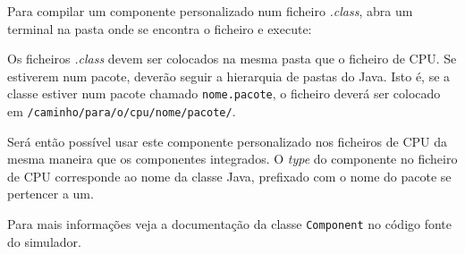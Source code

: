 \documentclass[11pt,a4paper,twoside,titlepage]{report}
\begin{document}
Para compilar um componente personalizado num ficheiro \emph{.class}, abra
um terminal na pasta onde se encontra o ficheiro e execute:



Os ficheiros \emph{.class} devem ser colocados na mesma pasta que o ficheiro de CPU.
Se estiverem num pacote, deverão seguir a hierarquia de pastas do Java.
Isto é, se a classe estiver num pacote chamado \verb+nome.pacote+, o ficheiro
deverá ser colocado em \verb+/caminho/para/o/cpu/nome/pacote/+.

Será então possível usar este componente personalizado nos ficheiros de CPU
da mesma maneira que os componentes integrados.
O \emph{type} do componente no ficheiro de CPU corresponde ao nome da classe
Java, prefixado com o nome do pacote se pertencer a um.

Para mais informações veja a documentação da classe \verb+Component+ no
código fonte do simulador.
\end{document}
